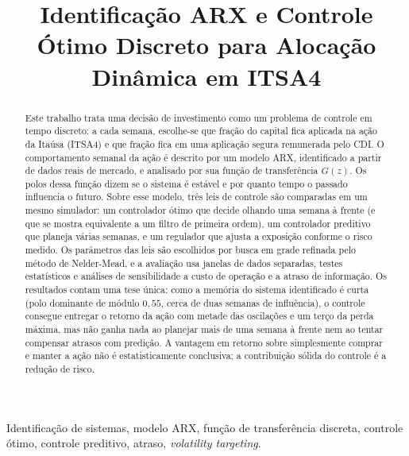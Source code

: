 \documentclass[conference]{IEEEtran}
\begin{document}
\title{Identificação ARX e Controle Ótimo Discreto para Alocação Dinâmica em ITSA4}

\author{
}

\maketitle

\begin{abstract}
Este trabalho trata uma decisão de investimento como um problema de controle em tempo discreto: a cada semana, escolhe-se que fração do capital fica aplicada na ação da Itaúsa (ITSA4) e que fração fica em uma aplicação segura remunerada pelo CDI. O comportamento semanal da ação é descrito por um modelo ARX, identificado a partir de dados reais de mercado, e analisado por sua função de transferência $G(z)$. Os polos dessa função dizem se o sistema é estável e por quanto tempo o passado influencia o futuro. Sobre esse modelo, três leis de controle são comparadas em um mesmo simulador: um controlador ótimo que decide olhando uma semana à frente (e que se mostra equivalente a um filtro de primeira ordem), um controlador preditivo que planeja várias semanas, e um regulador que ajusta a exposição conforme o risco medido. Os parâmetros das leis são escolhidos por busca em grade refinada pelo método de Nelder-Mead, e a avaliação usa janelas de dados separadas, testes estatísticos e análises de sensibilidade a custo de operação e a atraso de informação. Os resultados contam uma tese única: como a memória do sistema identificado é curta (polo dominante de módulo $0{,}55$, cerca de duas semanas de influência), o controle consegue entregar o retorno da ação com metade das oscilações e um terço da perda máxima, mas não ganha nada ao planejar mais de uma semana à frente nem ao tentar compensar atrasos com predição. A vantagem em retorno sobre simplesmente comprar e manter a ação não é estatisticamente conclusiva; a contribuição sólida do controle é a redução de risco.
\end{abstract}

\begin{IEEEkeywords}
Identificação de sistemas, modelo ARX, função de transferência discreta, controle ótimo, controle preditivo, atraso, \emph{volatility targeting}.
\end{IEEEkeywords}
\end{document}
